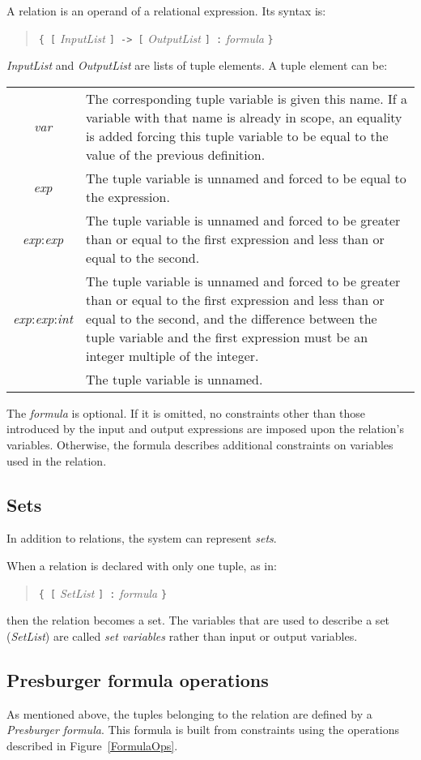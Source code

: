 A relation is an operand of a relational expression.
Its syntax is:
\begin{quote}
{\tt \{ [} {\em InputList} {\tt ] -> [} {\em OutputList} {\tt ] :} 
{\em formula} {\tt \}}
\end{quote}

{\em InputList} and {\em OutputList} are lists of tuple elements.
A tuple element can be:

\begin{tabular}{cp{5in}}
{\em var} & The corresponding tuple variable is given this name.
	If a variable with that name is already in scope,
	an equality is added
	forcing this tuple variable to be equal to the value
	of the previous definition.
\\
{\em exp} & The tuple variable is unnamed and forced to be equal
	to the expression.
\\
{\em exp}:{\em exp} & The tuple variable is unnamed and forced to be
	greater than or equal to the first expression and less than
	or equal to the second.
\\
{\em exp}:{\em exp}:{\em int} & The tuple variable is unnamed and forced to be
	greater than or equal to the first expression and less than
	or equal to the second, and the difference between the tuple
variable and the first expression must be an integer multiple of the
	integer.
\\
{\tt *} &The tuple variable is unnamed.
\end{tabular}


The {\em formula} is optional.  If it is omitted, no constraints other than
those introduced by the input and output expressions are imposed upon
the relation's variables.  Otherwise, the formula describes additional
constraints on variables used in the relation.  

\subsection{Sets}
In addition to relations, the system can represent {\em sets}.

When a relation is declared with only one tuple, as in:
\begin{quote}
{\tt \{ [} {\em SetList} {\tt ] :} {\em formula} {\tt \}}
\end{quote}
then the relation becomes a set.
The variables that are used to describe a set ({\em SetList}) 
are called {\em set variables} rather than input or output variables.

\subsection{Presburger formula operations}
As mentioned above, the tuples belonging to the relation are defined
by a {\em Presburger formula}.  This formula is built from constraints
using the operations described in Figure~\ref{FormulaOps}.

